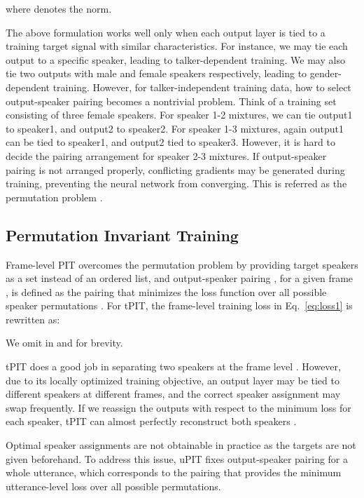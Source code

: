 \documentclass[journal]{IEEEtran}
\begin{document}
where  denotes the  norm.

The above formulation works well only when each output layer is tied to a training target signal with similar characteristics.
For instance, we may tie each output to a specific speaker, leading to talker-dependent training. 
We may also tie two outputs with male and female speakers respectively, leading to gender-dependent training. 
However, for talker-independent training data, how to select output-speaker pairing becomes a nontrivial problem.
Think of a training set consisting of three female speakers.
For speaker 1-2 mixtures, we can tie output1 to speaker1, and output2 to speaker2.
For speaker 1-3 mixtures, again output1 can be tied to speaker1, and output2 tied to speaker3.
However, it is hard to decide the pairing arrangement for speaker 2-3 mixtures. 
If output-speaker pairing is not arranged properly, conflicting gradients may be generated during training, preventing the neural network from converging.
This is referred as the permutation problem \cite{DC} \cite{PIT}. 

\subsection{Permutation Invariant Training }
\label{sec:3.2}

Frame-level PIT \cite{PIT} overcomes the permutation problem by providing target speakers as a set instead of an ordered list,
and output-speaker pairing , for a given frame , is defined as the pairing that minimizes the loss function over all possible speaker permutations . 
For tPIT, the frame-level training loss in Eq.~\ref{eq:loss1} is rewritten as:

We omit  in  and  for brevity.



tPIT does a good job in separating two speakers at the frame level \cite{PIT} \cite{me}.
However, due to its locally optimized training objective, an output layer may be tied to different speakers at different frames, and the correct speaker assignment may swap frequently.
If we reassign the outputs with respect to the minimum loss for each speaker, tPIT can almost perfectly reconstruct both speakers \cite{me}.

Optimal speaker assignments are not obtainable in practice as the targets are not given beforehand. 
To address this issue, uPIT fixes output-speaker pairing  for a whole utterance,
which corresponds to the pairing that provides the minimum utterance-level loss over all possible permutations.
\end{document}
